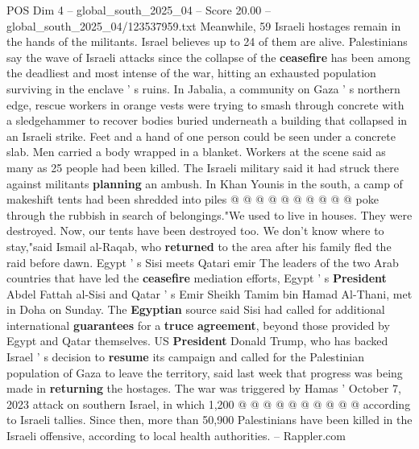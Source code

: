 \begin{textsample}{POS Dim 4 – global\_south\_2025\_04 – Score 20.00 – global\_south\_2025\_04/123537959.txt}
Meanwhile, 59 Israeli hostages remain in the hands of the militants.
Israel believes up to 24 of them are alive.
Palestinians say the wave of Israeli attacks since the collapse of the \textbf{ceasefire} has been among the deadliest and most intense of the war, hitting an exhausted population surviving in the enclave ' s ruins.
In Jabalia, a community on Gaza ' s northern edge, rescue workers in orange vests were trying to smash through concrete with a sledgehammer to recover bodies buried underneath a building that collapsed in an Israeli strike.
Feet and a hand of one person could be seen under a concrete slab.
Men carried a body wrapped in a blanket.
Workers at the scene said as many as 25 people had been killed.
The Israeli military said it had struck there against militants \textbf{planning} an ambush.
In Khan Younis in the south, a camp of makeshift tents had been shredded into piles @ @ @ @ @ @ @ @ @ @ poke through the rubbish in search of belongings."We used to live in houses.
They were destroyed.
Now, our tents have been destroyed too.
We don't know where to stay,"said Ismail al-Raqab, who \textbf{returned} to the area after his family fled the raid before dawn.
Egypt ' s Sisi meets Qatari emir The leaders of the two Arab countries that have led the \textbf{ceasefire} mediation efforts, Egypt ' s \textbf{President} Abdel Fattah al-Sisi and Qatar ' s Emir Sheikh Tamim bin Hamad Al-Thani, met in Doha on Sunday.
The \textbf{Egyptian} source said Sisi had called for additional international \textbf{guarantees} for a \textbf{truce} \textbf{agreement}, beyond those provided by Egypt and Qatar themselves.
US \textbf{President} Donald Trump, who has backed Israel ' s decision to \textbf{resume} its campaign and called for the Palestinian population of Gaza to leave the territory, said last week that progress was being made in \textbf{returning} the hostages.
The war was triggered by Hamas ' October 7, 2023 attack on southern Israel, in which 1,200 @ @ @ @ @ @ @ @ @ @ according to Israeli tallies.
Since then, more than 50,900 Palestinians have been killed in the Israeli offensive, according to local health authorities. -- Rappler.com

\end{textsample}
